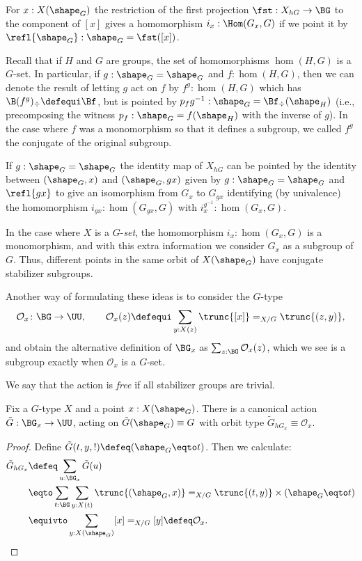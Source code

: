 
  For $x:X(\shape_G)$ the restriction of the first projection $\fst:X_{hG}\to\BG$ to the component of $[x]$ gives a homomorphism $i_x:\Hom(G_x,G)$ if we point it by $\refl{\shape_G}:\shape_G=\fst([x])$.

  Recall that if $H$ and $G$ are groups, the set of homomorphisms $\hom(H,G)$ is a $G$-set.  In particular, if $g:\shape_G=\shape_G$ and $f:\hom(H,G)$, then we can denote the result of letting $g$ act on $f$ by $f^g:\hom(H,G)$ which has $\B(f^g)_\div\defequi\Bf$, but is pointed by $p_fg^{-1}:\shape_G=\Bf_\div(\shape_H)$ (i.e., precomposing the witness $p_f:\shape_G=f(\shape_H)$ with the inverse of $g$).  In the case where $f$ was a monomorphism so that it defines a subgroup, we called $f^g$ the conjugate of the original subgroup.
  
 If $g:\shape_G=\shape_G$ the identity map of $X_{hG}$ can be pointed by the identity between $(\shape_G,x) $ and $(\shape_G,gx)$ given by $g:\shape_G=\shape_G$ and $\refl{gx}$ to give an isomorphism from $G_x$ to $G_{gx}$ identifying (by univalence) the homomorphism $i_{gx}:\hom(G_{gx},G)$ with $i^{g^{-1}}_x:\hom(G_x,G)$.


In the case where $X$ is a $G$-\emph{set}, the homomorphism $i_x:\hom(G_x,G)$ is a monomorphism, and with this extra information we consider $G_x$ as a subgroup of $G$.
Thus, different points in the same orbit of $X(\shape_G)$ have conjugate stabilizer subgroups.

Another way of formulating these ideas is to consider the $G$-type
\[
  \mathcal O_x\colon\BG\to\UU,\qquad
  \mathcal O_x(z)\defequi\sum_{y:X(z)}\trunc{[x]}=_{X/G}\trunc{(z,y)},
\]
and obtain the alternative definition of $\BG_x$ as $\sum_{z:\BG}\mathcal O_x(z)$, which we see is a subgroup exactly when $\mathcal O_x$ is a $G$-set.

We say that the action is \emph{free} if all stabilizer groups are trivial.

\begin{theorem}
  \label{thm:orbitstab}
  Fix a $G$-type $X$ and a point $x : X(\shape_G)$.
  There is a canonical action $\tilde G : \BG_x \to \UU$,
  acting on $\tilde G(\shape_G)\equiv G$
  with orbit type $\tilde G_{hG_x} \equiv \mathcal O_x$.
\end{theorem}
\begin{proof}
  Define $\tilde G(t,y,!) \defeq (\shape_G \eqto t)$.
  Then we calculate:
  \begin{align*}
    \tilde G_{hG_x}
    &\defeq \sum_{u : \BG_x}\tilde G(u) \\
    &\eqto \sum_{t:\BG}\sum_{y:X(t)}\trunc{(\shape_G,x)} =_{X/G} \trunc{(t,y)}
      \times (\shape_G \eqto t) \\
    &\equivto \sum_{y:X(\shape_G)}[x] =_{X/G} [y] \defeq \mathcal O_x.\qedhere
  \end{align*}
\end{proof}

